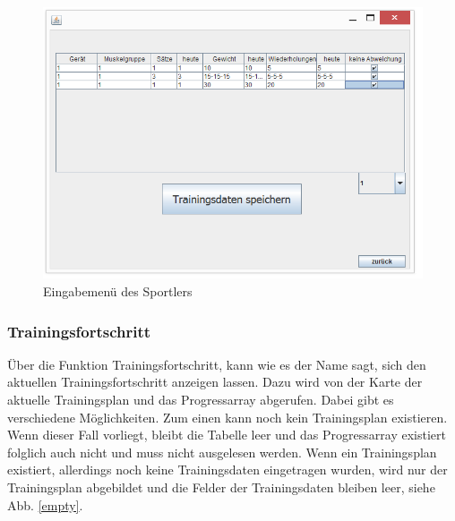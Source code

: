 \begin{figure}[h]
\includegraphics[width=1\hsize]{./images/sportler.png}
\caption{Eingabemenü des Sportlers}
\label{sportler}
\end{figure}
\newpage
\subsubsection*{Trainingsfortschritt}

Über die Funktion Trainingsfortschritt, kann wie es der Name sagt, sich den aktuellen Trainingsfortschritt anzeigen lassen. Dazu wird von der Karte der aktuelle Trainingsplan und das Progressarray abgerufen. Dabei gibt es verschiedene Möglichkeiten. Zum einen kann noch kein Trainingsplan existieren. Wenn dieser Fall vorliegt, bleibt die Tabelle leer und das Progressarray existiert folglich auch nicht und muss nicht ausgelesen werden. Wenn ein Trainingsplan existiert, allerdings noch keine Trainingsdaten eingetragen wurden, wird nur der Trainingsplan abgebildet und die Felder der Trainingsdaten bleiben leer, siehe Abb. \ref{empty}.

